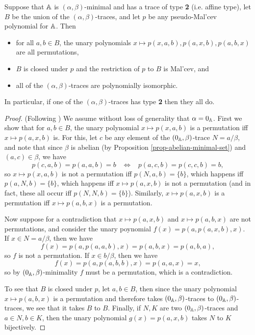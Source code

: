 \begin{appendices}
\begin{thm}\label{thm-pseudo-malcev} Suppose that $\mathbb{A}$ is $(\alpha,\beta)$-minimal and has a trace of type \textbf{2} (i.e. affine type), let $B$ be the union of the $(\alpha,\beta)$-traces, and let $p$ be any pseudo-Mal'cev polynomial for $\mathbb{A}$. Then
\begin{itemize}
\item for all $a,b \in B$, the unary polynomials $x \mapsto p(x,a,b), p(a,x,b), p(a,b,x)$ are all permutations,
\item $B$ is closed under $p$ and the restriction of $p$ to $B$ is Mal'cev, and
\item all of the $(\alpha,\beta)$-traces are polynomially isomorphic.
\end{itemize}
In particular, if one of the $(\alpha,\beta)$-traces has type \textbf{2} then they all do.
\end{thm}
\begin{proof} (Following \cite{hobby-mckenzie}) We assume without loss of generality that $\alpha = 0_{\mathbb{A}}$. First we show that for $a,b \in B$, the unary polynomial $x \mapsto p(x,a,b)$ is a permutation iff $x \mapsto p(a,x,b)$ is. For this, let $c$ be any element of the $(0_{\mathbb{A}},\beta)$-trace $N = a/\beta$, and note that since $\beta$ is abelian (by Proposition \ref{prop-abelian-minimal-set}) and $(a,c) \in \beta$, we have
\[
p(c,a,b) = p(a,a,b) = b \;\;\; \iff \;\;\; p(a,c,b) = p(c,c,b) = b,
\]
so $x \mapsto p(x,a,b)$ is not a permutation iff $p(N,a,b) = \{b\}$, which happens iff $p(a,N,b) = \{b\}$, which happens iff $x \mapsto p(a,x,b)$ is not a permutation (and in fact, these all occur iff $p(N,N,b) = \{b\}$). Similarly, $x \mapsto p(a,x,b)$ is a permutation iff $x \mapsto p(a,b,x)$ is a permutation.

Now suppose for a contradiction that $x \mapsto p(a,x,b)$ and $x \mapsto p(a,b,x)$ are not permutations, and consider the unary poynomial $f(x) = p(a,p(a,x,b),x)$. If $x \in N = a/\beta$, then we have
\[
f(x) = p(a,p(a,a,b),x) = p(a,b,x) = p(a,b,a),
\]
so $f$ is not a permutation. If $x \in b/\beta$, then we have
\[
f(x) = p(a,p(a,b,b),x) = p(a,a,x) = x,
\]
so by $(0_{\mathbb{A}},\beta)$-minimality $f$ must be a permutation, which is a contradiction.

To see that $B$ is closed under $p$, let $a,b \in B$, then since the unary polynomial $x \mapsto p(a,b,x)$ is a permutation and therefore takes $(0_{\mathbb{A}},\beta)$-traces to $(0_{\mathbb{A}},\beta)$-traces, we see that it takes $B$ to $B$. Finally, if $N, K$ are two $(0_{\mathbb{A}},\beta)$-traces and $a \in N, b \in K$, then the unary polynomial $g(x) = p(a,x,b)$ takes $N$ to $K$ bijectively.
\end{proof}


\end{appendices}
